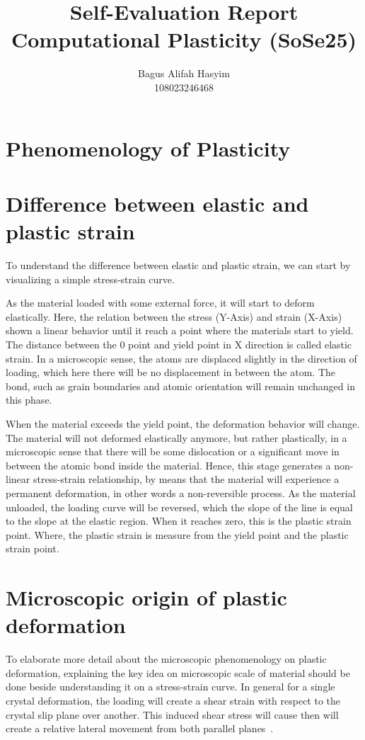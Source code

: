 \documentclass[12pt]{article}
\title{Self-Evaluation Report \\ \large Computational Plasticity (SoSe25)}
\author{Bagus Alifah Hasyim \\ 108023246468}
\date{}
\begin{document}
\maketitle

\section*{Phenomenology of Plasticity}

\section{Difference between elastic and plastic strain}
\hspace{2em}To understand the difference between elastic and plastic strain, we can start by visualizing a simple stress-strain
curve. 

\hspace{2em}
As the material loaded with some external force, it will start to deform elastically. Here, the relation
between the stress (Y-Axis) and strain (X-Axis) shown a linear behavior until it reach a point where the materials start to yield.
The distance between the 0 point and yield point in X direction is called elastic strain. In a microscopic sense, the atoms are
displaced slightly in the direction of loading, which here there will be no displacement in between the atom. The bond, such 
as grain boundaries and atomic orientation will remain unchanged in this phase.

\hspace{2em}
When the material exceeds the yield point, the deformation behavior will change. The material will not deformed elastically anymore, 
but rather plastically, in a microscopic sense that there will be some dislocation or a significant move in between the atomic bond
inside the material. Hence, this stage generates a non-linear stress-strain relationship, by means that the material will experience
a permanent deformation, in other words a non-reversible process. As the material unloaded, the loading curve will be reversed, which
the slope of the line is equal to the slope at the elastic region. When it reaches zero, this is the plastic strain point. Where, the 
plastic strain is measure from the yield point and the plastic strain point.
\section{Microscopic origin of plastic deformation}
\hspace{2em}
To elaborate more detail about the microscopic phenomenology on plastic deformation, explaining the key idea on microscopic 
scale of material should be done beside understanding it on a stress-strain curve. In general for a single crystal deformation, 
the loading will create a shear strain with respect to the crystal slip plane over another. This induced shear stress will cause
then will create a relative lateral movement from both parallel planes~\cite{taylor1934plastic}. 
\end{document}
